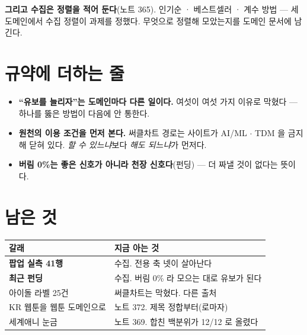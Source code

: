 \documentclass[11pt]{article}
\begin{document}
\textbf{그리고 수집은 정렬을 적어 둔다}(노트 365). 인기순 · 베스트셀러 ·
계수 방법 --- 세 도메인에서 수집 정렬이 과제를 정했다. 무엇으로 정렬해
모았는지를 도메인 문서에 남긴다.

\section{규약에 더하는 줄}

\begin{itemize}
\item \textbf{``유보를 늘리자''는 도메인마다 다른 일이다.} 여섯이 여섯
가지 이유로 막혔다 --- 하나를 뚫은 방법이 다음에 안 통한다.
\item \textbf{원천의 이용 조건을 먼저 본다.} 써클차트 경로는 사이트가
AI/ML $\cdot$ TDM 을 금지해 닫혀 있다. \emph{할 수 있느냐}보다 \emph{해도
되느냐}가 먼저다.
\item \textbf{버림 0\%는 좋은 신호가 아니라 천장 신호다}(펀딩) --- 더
짜낼 것이 없다는 뜻이다.
\end{itemize}

\section{남은 것}

\begin{center}
\begin{tabular}{ll}
\hline
갈래 & 지금 아는 것 \\
\hline
\textbf{팝업 실측 41행} & 수집. 전용 축 넷이 살아난다 \\
\textbf{최근 펀딩} & 수집. 버림 0\% 라 모으는 대로 유보가 된다 \\
아이돌 라벨 25건 & 써클차트는 막혔다. 다른 출처 \\
KR 웹툰을 웹툰 도메인으로 & 노트 372. 제목 정합부터(로마자) \\
세계애니 눈금 & 노트 369. 합친 백분위가 12/12 로 올렸다 \\
\hline
\end{tabular}
\end{center}
\end{document}
